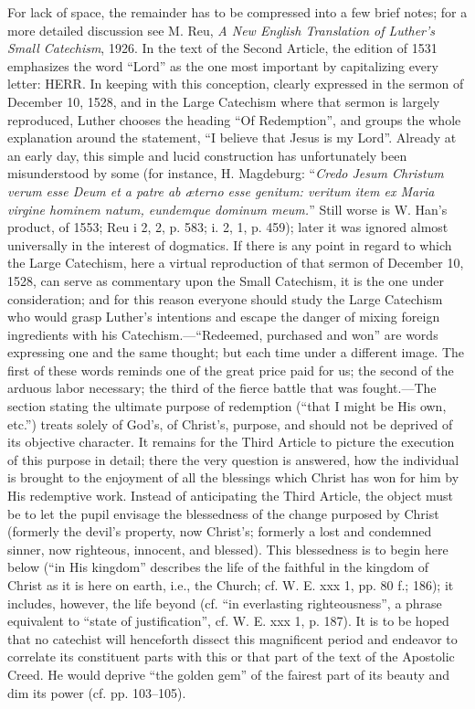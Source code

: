 For lack of space, the remainder has to be compressed into a few brief notes; for a more detailed discussion see M. Reu, \emph{A New English Translation of Luther’s Small Catechism}, 1926. In the text of the Second Article, the edition of 1531 emphasizes the word “Lord” as the one most important by capitalizing every letter: HERR. In keeping with this conception, clearly expressed in the sermon of December 10, 1528, and in the Large Catechism where that sermon is largely reproduced, Luther chooses the heading “Of Redemption”, and groups the whole explanation around the statement, “I believe that Jesus is my Lord”. Already at an early day, this simple and lucid construction has unfortunately been misunderstood by some (for instance, H. Magdeburg: “\emph{Credo Jesum Christum verum}
\emph{esse Deum et a patre ab æterno esse genitum: veritum item ex Maria virgine hominem natum, eundemque dominum meum.}” Still worse is W. Han’s product, of 1553; Reu i 2, 2, p. 583; i. 2, 1, p. 459); later it was ignored almost universally in the interest of dogmatics. If there is any point in regard to which the Large Catechism, here a virtual reproduction of that sermon of December 10, 1528, can serve as commentary upon the Small Catechism, it is the one under consideration; and for this reason everyone should study the Large Catechism who would grasp Luther’s intentions and escape the danger of mixing foreign ingredients with his Catechism.—“Redeemed, purchased and won” are words expressing one and the same thought; but each time under a different image. The first of these words reminds one of the great price paid for us; the second of the arduous labor necessary; the third of the fierce battle that was fought.—The section stating the ultimate purpose of redemption (“that I might be His own, etc.”) treats solely of God’s, of Christ’s, purpose, and should not be deprived of its objective character. It remains for the Third Article to picture the execution of this purpose in detail; there the very question is answered, how the individual is brought to the enjoyment of all the blessings which Christ has won for him by His redemptive work. Instead of anticipating the Third Article, the object must be to let the pupil envisage the blessedness of the change purposed by Christ (formerly the devil’s property, now Christ’s; formerly a lost and condemned sinner, now righteous, innocent, and blessed). This blessedness is to begin here below (“in His kingdom” describes the life of the faithful in the kingdom of Christ as it is here on earth, i.e., the Church; cf. W. E. xxx 1, pp. 80 f.; 186); it includes, however, the life beyond (cf. “in everlasting righteousness”, a phrase equivalent to “state of justification”, cf. W. E. xxx 1, p. 187). It is to be hoped that no catechist will henceforth dissect this magnificent period and endeavor to correlate its constituent parts with this or that part of the text of the Apostolic Creed. He would deprive “the golden gem” of the fairest part of its beauty and dim its power (cf. pp. 103–105).

